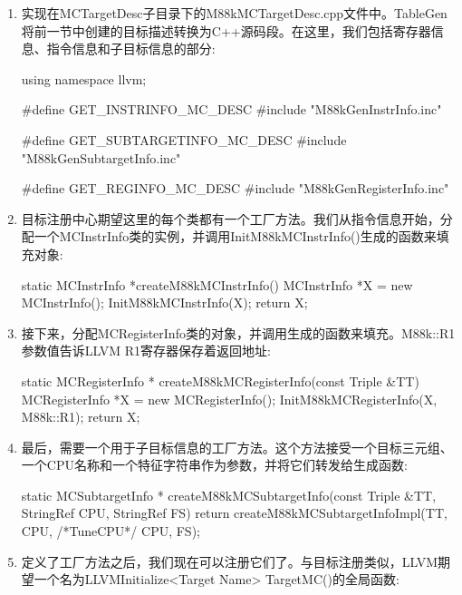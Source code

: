 \begin{enumerate}
\item
实现在MCTargetDesc子目录下的M88kMCTargetDesc.cpp文件中。TableGen将前一节中创建的目标描述转换为C++源码段。在这里，我们包括寄存器信息、指令信息和子目标信息的部分:

\begin{cpp}
using namespace llvm;

#define GET_INSTRINFO_MC_DESC
#include "M88kGenInstrInfo.inc"

#define GET_SUBTARGETINFO_MC_DESC
#include "M88kGenSubtargetInfo.inc"

#define GET_REGINFO_MC_DESC
#include "M88kGenRegisterInfo.inc"
\end{cpp}

\item
目标注册中心期望这里的每个类都有一个工厂方法。我们从指令信息开始，分配一个MCInstrInfo类的实例，并调用InitM88kMCInstrInfo()生成的函数来填充对象:

\begin{cpp}
static MCInstrInfo *createM88kMCInstrInfo() {
    MCInstrInfo *X = new MCInstrInfo();
    InitM88kMCInstrInfo(X);
    return X;
}
\end{cpp}

\item
接下来，分配MCRegisterInfo类的对象，并调用生成的函数来填充。M88k::R1参数值告诉LLVM R1寄存器保存着返回地址:

\begin{cpp}
static MCRegisterInfo *
createM88kMCRegisterInfo(const Triple &TT) {
    MCRegisterInfo *X = new MCRegisterInfo();
    InitM88kMCRegisterInfo(X, M88k::R1);
    return X;
}
\end{cpp}

\item
最后，需要一个用于子目标信息的工厂方法。这个方法接受一个目标三元组、一个CPU名称和一个特征字符串作为参数，并将它们转发给生成函数:

\begin{cpp}
static MCSubtargetInfo *
createM88kMCSubtargetInfo(const Triple &TT,
StringRef CPU, StringRef FS) {
    return createM88kMCSubtargetInfoImpl(TT, CPU,
                                        /*TuneCPU*/ CPU,
                                        FS);
}
\end{cpp}

\item
定义了工厂方法之后，我们现在可以注册它们了。与目标注册类似，LLVM期望一个名为LLVMInitialize<Target Name> TargetMC()的全局函数:


\end{enumerate}
